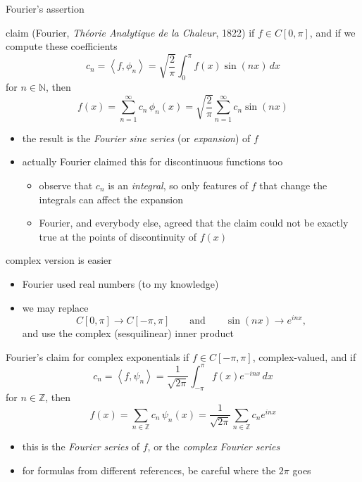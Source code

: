 \documentclass[10pt,
               svgnames,
               hyperref={colorlinks,
                         citecolor=DeepPink4,
                         linkcolor=FireBrick,
                         urlcolor=blue},
               usepdftitle=false]{beamer}
\newcommand{\NN}{\mathbb{N}}
\newcommand{\ZZ}{\mathbb{Z}}
\newcommand{\ip}[2]{\left<#1,#2\right>}
\begin{document}
\begin{frame}{Fourier's assertion}

\begin{block}{claim (Fourier, \emph{Th\'eorie Analytique de la Chaleur}, 1822)}
if $f\in C[0,\pi]$, and if we compute these coefficients
	$$c_n = \ip{f}{\phi_n} = \sqrt{\frac{2}{\pi}} \int_0^\pi f(x) \sin(nx)\,dx$$
for $n\in \NN$, then
	$$f(x) = \sum_{n=1}^\infty c_n\, \phi_n(x) = \sqrt{\frac{2}{\pi}} \sum_{n=1}^\infty c_n \sin(nx)$$
\end{block}

\begin{itemize}
\item the result is the \emph{Fourier sine series} (or \emph{expansion}) of $f$
\item actually Fourier claimed this for discontinuous functions too
   \begin{itemize}
   \item[$\circ$] observe that $c_n$ is an \emph{integral}, so only features of $f$ that change the integrals can affect the expansion
   \item[$\circ$] Fourier, and everybody else, agreed that the claim could not be exactly true at the points of discontinuity of $f(x)$
   \end{itemize}
\end{itemize}
\end{frame}


\begin{frame}{complex version is easier}

\begin{itemize}
\item Fourier used real numbers (to my knowledge)
\item we may replace
	$$C[0,\pi] \to C[-\pi,\pi] \qquad \text{and} \qquad \sin(nx) \to e^{inx},$$
and use the complex (sesquilinear) inner product
\end{itemize}

\begin{block}{Fourier's claim for complex exponentials}
if $f\in C[-\pi,\pi]$, complex-valued, and if
	$$c_n = \ip{f}{\psi_n} = \frac{1}{\sqrt{2\pi}} \int_{-\pi}^\pi f(x) e^{-inx}\,dx$$
for $n\in\ZZ$, then
	$$f(x) = \sum_{n\in\ZZ} c_n\, \psi_n(x) = \frac{1}{\sqrt{2\pi}} \sum_{n\in\ZZ} c_n e^{inx}$$
\end{block}

\begin{itemize}
\item this is the \emph{Fourier series} of $f$, or the \emph{complex Fourier series}
\item for formulas from different references, be careful where the $2\pi$ goes
\end{itemize}
\end{frame}
\end{document}
